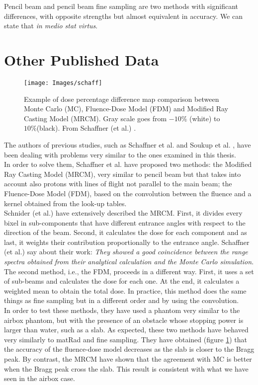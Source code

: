 \documentclass[12pt, a4paper, twoside]{book}
\begin{document}
Pencil beam and pencil beam fine sampling are two methods with significant differences, with opposite strengths but almost equivalent in accuracy. We can state that \emph{in medio stat virtus}.


\section{Other Published Data}
\begin{figure}[!h]
\centering
{\texttt{[image: Images/schaff]}} 
\caption{Example of dose percentage difference map comparison between Monte Carlo (MC), Fluence-Dose Model (FDM) and Modified Ray Casting Model (MRCM). Gray scale goes from $-10\%$ (white) to $10\%$(black). From Schaffner (et al.) \cite{schaf:pba}.}
\label{fig:schaff}
\end{figure}

The authors of previous studies, such as Schaffner et al. \cite{schaf:pba} and Soukup et al. \cite{souk:pba}, have been dealing with problems very similar to the ones examined in this thesis.\\
In order to solve them, Schaffner et al. \cite{schaf:pba} have proposed two methods: the Modified Ray Casting Model (MRCM), very similar to pencil beam but that takes into account also protons with lines of flight not parallel to the main beam; the Fluence-Dose Model (FDM), based on the convolution between the fluence and a kernel obtained from the look-up tables.\\
Schnider (et al.) \cite{schn:pba} have extensively described the MRCM. First, it divides every bixel in sub-components that have different entrance angles with respect to the direction of the beam. Second, it calculates the dose for each component and as last, it weights their contribution proportionally to the entrance angle. Schaffner (et al.) say about their work: \emph{They showed a good coincidence between the range spectra obtained from their analytical calculation and the Monte Carlo simulation}.\\
The second method, i.e., the FDM, proceeds in a different way. First, it uses a set of sub-beams and calculates the dose for each one. At the end, it calculates a weighted mean to obtain the total dose. In practice, this method does the same things as fine sampling but in a different order and by using the convolution.\\
In order to test these methods, they have used a phantom very similar to the airbox phantom, but with the presence of an obstacle whose stopping power is larger than water, such as a slab. As expected, these two methods have behaved very similarly to matRad and fine sampling. They have obtained (figure \ref{fig:schaff}) that the accuracy of the fluence-dose model decreases as the slab is closer to the Bragg peak. By contrast, the MRCM have shown that the agreement with MC is better when the Bragg peak cross the slab. This result is consistent with what we have seen in the airbox case.
\end{document}
